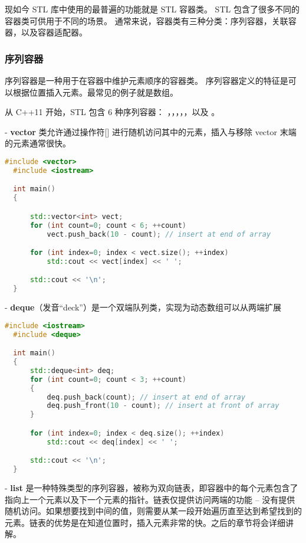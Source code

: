 \documentclass[../../LearnCpp.tex]{subfiles}
\begin{document}

现如今 STL 库中使用的最普遍的功能就是 STL 容器类。
STL 包含了很多不同的容器类可供用于不同的场景。
通常来说，容器类有三种分类：序列容器，关联容器，以及容器适配器。

\subsubsection*{序列容器}

序列容器是一种用于在容器中维护元素顺序的容器类。
序列容器定义的特征是可以根据位置插入元素。最常见的例子就是数组。

从 C++11 开始，STL 包含 6 种序列容器：
，，，，，以及 。

- \textbf{vector} 类允许通过操作符[] 进行随机访问其中的元素，插入与移除 vector 末端的元素通常很快。

\begin{lstlisting}[language=C++]
  #include <vector>
  #include <iostream>

  int main()
  {

      std::vector<int> vect;
      for (int count=0; count < 6; ++count)
          vect.push_back(10 - count); // insert at end of array

      for (int index=0; index < vect.size(); ++index)
          std::cout << vect[index] << ' ';

      std::cout << '\n';
  }
  \end{lstlisting}

- \textbf{deque}（发音“deck”）是一个双端队列类，实现为动态数组可以从两端扩展

\begin{lstlisting}[language=C++]
  #include <iostream>
  #include <deque>

  int main()
  {
      std::deque<int> deq;
      for (int count=0; count < 3; ++count)
      {
          deq.push_back(count); // insert at end of array
          deq.push_front(10 - count); // insert at front of array
      }

      for (int index=0; index < deq.size(); ++index)
          std::cout << deq[index] << ' ';

      std::cout << '\n';
  }
  \end{lstlisting}

- \textbf{list} 是一种特殊类型的序列容器，被称为双向链表，即容器中的每个元素包含了指向上一个元素以及下一个元素的指针。链表仅提供访问两端的功能 -- 没有提供随机访问。如果想要找到中间的值，则需要从某一段开始遍历直至达到希望找到的元素。链表的优势是在知道位置时，插入元素非常的快。之后的章节将会详细讲解。
\end{document}

